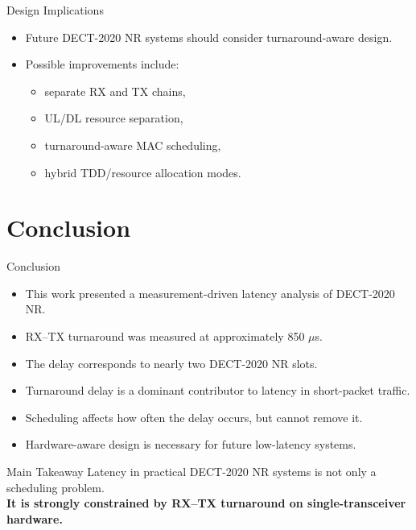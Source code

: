\documentclass[10pt]{beamer}
\begin{document}
\begin{frame}{Design Implications}
\begin{itemize}
    \item Future DECT-2020 NR systems should consider turnaround-aware design.
    \item Possible improvements include:
    \begin{itemize}
        \item separate RX and TX chains,
        \item UL/DL resource separation,
        \item turnaround-aware MAC scheduling,
        \item hybrid TDD/resource allocation modes.
    \end{itemize}
\end{itemize}
\end{frame}

\section{Conclusion}

\begin{frame}{Conclusion}
\begin{itemize}
    \item This work presented a measurement-driven latency analysis of DECT-2020 NR.
    \item RX--TX turnaround was measured at approximately 850 $\mu$s.
    \item The delay corresponds to nearly two DECT-2020 NR slots.
    \item Turnaround delay is a dominant contributor to latency in short-packet traffic.
    \item Scheduling affects how often the delay occurs, but cannot remove it.
    \item Hardware-aware design is necessary for future low-latency systems.
\end{itemize}
\end{frame}

\begin{frame}{Main Takeaway}
\centering
\Large
Latency in practical DECT-2020 NR systems is not only a scheduling problem.\\[0.5cm]

\textbf{It is strongly constrained by RX--TX turnaround on single-transceiver hardware.}
\end{frame}
\end{document}
